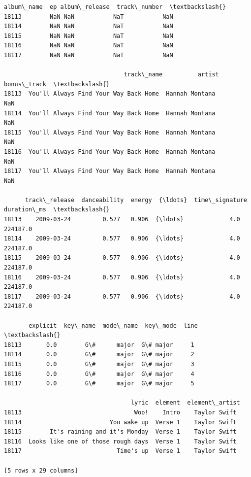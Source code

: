 \documentclass[11pt]{article}
\makeatletter
\newcommand{\boxspacing}{\kern\kvtcb@left@rule\kern\kvtcb@boxsep}
\newcommand{\prompt}[4]{
        {\ttfamily\llap{{\color{#2}[#3]:\hspace{3pt}#4}}\vspace{-\baselineskip}}
    }
\makeatother
\begin{document}
            \begin{tcolorbox}[breakable, size=fbox, boxrule=.5pt, pad at break*=1mm, opacityfill=0]
\prompt{Out}{outcolor}{81}{\boxspacing}
\begin{Verbatim}[commandchars=\\\{\}]
      album\_name  ep album\_release  track\_number  \textbackslash{}
18113        NaN NaN           NaT           NaN
18114        NaN NaN           NaT           NaN
18115        NaN NaN           NaT           NaN
18116        NaN NaN           NaT           NaN
18117        NaN NaN           NaT           NaN

                                  track\_name          artist  bonus\_track  \textbackslash{}
18113  You'll Always Find Your Way Back Home  Hannah Montana          NaN
18114  You'll Always Find Your Way Back Home  Hannah Montana          NaN
18115  You'll Always Find Your Way Back Home  Hannah Montana          NaN
18116  You'll Always Find Your Way Back Home  Hannah Montana          NaN
18117  You'll Always Find Your Way Back Home  Hannah Montana          NaN

      track\_release  danceability  energy  {\ldots}  time\_signature  duration\_ms  \textbackslash{}
18113    2009-03-24         0.577   0.906  {\ldots}             4.0     224187.0
18114    2009-03-24         0.577   0.906  {\ldots}             4.0     224187.0
18115    2009-03-24         0.577   0.906  {\ldots}             4.0     224187.0
18116    2009-03-24         0.577   0.906  {\ldots}             4.0     224187.0
18117    2009-03-24         0.577   0.906  {\ldots}             4.0     224187.0

       explicit  key\_name  mode\_name  key\_mode  line  \textbackslash{}
18113       0.0        G\#      major  G\# major     1
18114       0.0        G\#      major  G\# major     2
18115       0.0        G\#      major  G\# major     3
18116       0.0        G\#      major  G\# major     4
18117       0.0        G\#      major  G\# major     5

                                    lyric  element  element\_artist
18113                                Woo!    Intro    Taylor Swift
18114                         You wake up  Verse 1    Taylor Swift
18115        It's raining and it's Monday  Verse 1    Taylor Swift
18116  Looks like one of those rough days  Verse 1    Taylor Swift
18117                           Time's up  Verse 1    Taylor Swift

[5 rows x 29 columns]
\end{Verbatim}
\end{tcolorbox}
        
\end{document}
